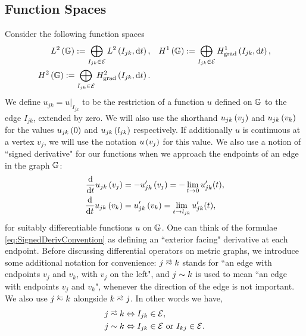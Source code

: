 \subsection{Function Spaces} \label{ssec:FunctionSpaces}
Consider the following function spaces
\begin{subequations} \label{eq:GraphFuncSpaces}
	\begin{align}
		L^2\left( \mathbb{G} \right) := \bigoplus_{I_{jk}\in \mathcal{E}} L^{2}\left( I_{jk},\mathrm{d}t \right),
		&\quad H^1\left( \mathbb{G} \right) := \bigoplus_{I_{jk}\in \mathcal{E}} H^1_\mathrm{grad}\left( I_{jk}, \mathrm{d}t \right), \\
		H^2\left( \mathbb{G} \right) := \bigoplus_{I_{jk}\in \mathcal{E}} H^2_\mathrm{grad}\left( I_{jk}, \mathrm{d} t \right). &
	\end{align}
\end{subequations}
We define $u_{jk} = u\vert_{I_{jk}}$ to be the restriction of a function $u$ defined on $\mathbb{G}$ to the edge $I_{jk}$, extended by zero.
We will also use the shorthand $u_{jk}\left( v_j \right)$ and $u_{jk}\left( v_k \right)$ for the values $u_{jk}\left( 0 \right)$ and $u_{jk}\left( l_{jk} \right)$ respectively.
If additionally $u$ is continuous at a vertex $v_j$, we will use the notation $u\left( v_j \right)$ for this value.
We also use a notion of ``signed derivative" for our functions when we approach the endpoints of an edge in the graph $\mathbb{G}$:
\begin{subequations} \label{eq:SignedDerivConvention}
	\begin{align}
		\dfrac{\mathrm{d}}{\mathrm{d}t}u_{jk}\left( v_j \right) &= -u_{jk}'\left( v_j \right) = -\lim_{t\rightarrow0}u_{jk}'(t), \\
		\dfrac{\mathrm{d}}{\mathrm{d}t}u_{jk}\left( v_k \right) &= u_{jk}'\left( v_k \right) = \lim_{t\rightarrow l_{jk}}u_{jk}'(t),
	\end{align}
\end{subequations}
for suitably differentiable functions $u$ on $\mathbb{G}$. 
One can think of the formulae \eqref{eq:SignedDerivConvention} as defining an ``exterior facing" derivative at each endpoint.
Before discussing differential operators on metric graphs, we introduce some additional notation for convenience: $j\conLeft k$ stands for ``an edge with endpoints $v_j$ and $v_k$, with $v_j$ on the left", and $j\sim k$ is used to mean ``an edge with endpoints $v_j$ and $v_k$", whenever the direction of the edge is not important.
We also use $j \conRight k$ alongside $k\conLeft j$.
In other words we have,
\begin{align*}
	j\conLeft k &\Leftrightarrow I_{jk}\in \edgeSet, \\
	j\con k &\Leftrightarrow I_{jk}\in \edgeSet \text{ or } I_{kj}\in \edgeSet.
\end{align*}
